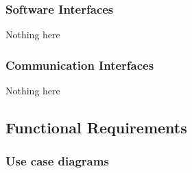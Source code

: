 \subsubsection{Software Interfaces}
Nothing here

\subsubsection{Communication Interfaces}
Nothing here


\subsection{Functional Requirements}
\subsubsection{Use case diagrams}
